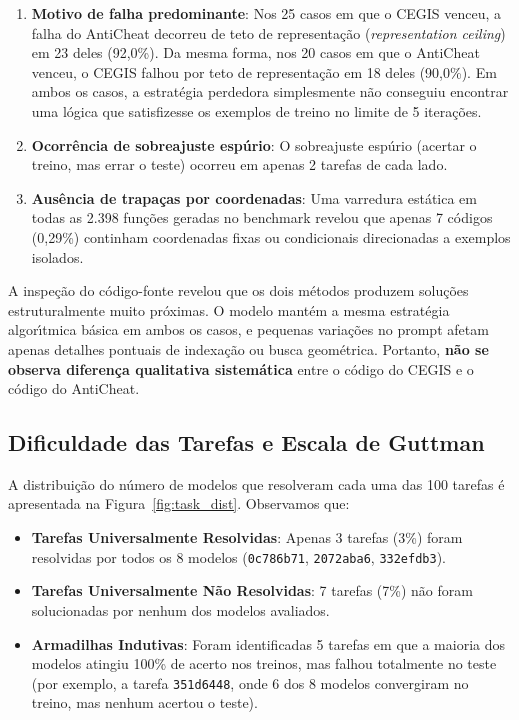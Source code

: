 \begin{enumerate}
    \item \textbf{Motivo de falha predominante}: Nos 25 casos em que o CEGIS venceu, a falha do AntiCheat decorreu de teto de representa\c{c}\~{a}o (\textit{representation ceiling}) em 23 deles (92,0\%). Da mesma forma, nos 20 casos em que o AntiCheat venceu, o CEGIS falhou por teto de representa\c{c}\~{a}o em 18 deles (90,0\%). Em ambos os casos, a estrat\'{e}gia perdedora simplesmente n\~{a}o conseguiu encontrar uma l\'{o}gica que satisfizesse os exemplos de treino no limite de 5 itera\c{c}\~{o}es.
    \item \textbf{Ocorr\^{e}ncia de sobreajuste esp\'{u}rio}: O sobreajuste esp\'{u}rio (acertar o treino, mas errar o teste) ocorreu em apenas 2 tarefas de cada lado.
    \item \textbf{Aus\^{e}ncia de trapa\c{c}as por coordenadas}: Uma varredura est\'{a}tica em todas as 2.398 fun\c{c}\~{o}es geradas no benchmark revelou que apenas 7 c\'{o}digos (0,29\%) continham coordenadas fixas ou condicionais direcionadas a exemplos isolados.
\end{enumerate}

A inspe\c{c}\~{a}o do c\'{o}digo-fonte revelou que os dois m\'{e}todos produzem solu\c{c}\~{o}es estruturalmente muito pr\'{o}ximas. O modelo mant\'{e}m a mesma estrat\'{e}gia algor\'{\i}tmica b\'{a}sica em ambos os casos, e pequenas varia\c{c}\~{o}es no prompt afetam apenas detalhes pontuais de indexa\c{c}\~{a}o ou busca geom\'{e}trica. Portanto, \textbf{n\~{a}o se observa diferen\c{c}a qualitativa sistem\'{a}tica} entre o c\'{o}digo do CEGIS e o c\'{o}digo do AntiCheat.

\subsection{Dificuldade das Tarefas e Escala de Guttman}

A distribui\c{c}\~{a}o do n\'{u}mero de modelos que resolveram cada uma das 100 tarefas \'{e} apresentada na Figura~\ref{fig:task_dist}. Observamos que:
\begin{itemize}
    \item \textbf{Tarefas Universalmente Resolvidas}: Apenas 3 tarefas (3\%) foram resolvidas por todos os 8 modelos (\texttt{0c786b71}, \texttt{2072aba6}, \texttt{332efdb3}).
    \item \textbf{Tarefas Universalmente N\~{a}o Resolvidas}: 7 tarefas (7\%) n\~{a}o foram solucionadas por nenhum dos modelos avaliados.
    \item \textbf{Armadilhas Indutivas}: Foram identificadas 5 tarefas em que a maioria dos modelos atingiu 100\% de acerto nos treinos, mas falhou totalmente no teste (por exemplo, a tarefa \texttt{351d6448}, onde 6 dos 8 modelos convergiram no treino, mas nenhum acertou o teste).
\end{itemize}

